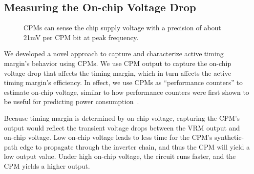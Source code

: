 \subsection{Measuring the On-chip Voltage Drop}
\label{sec:voltage:rootcause:cpm-measurement}

\begin{figure}[t]
\centering
\caption{CPMs can sense the chip supply voltage with a precision of about 21mV per CPM bit at peak frequency.}
\label{fig:cpm-analysis}
\end{figure}

We developed a novel approach to capture and characterize active timing margin's behavior using CPMs. We use CPM output to capture the on-chip voltage drop that affects the timing margin, which in turn affects the active timing margin's efficiency. In effect, we use CPMs as ``performance counters'' to estimate on-chip voltage, similar to how performance counters were first shown to be useful for predicting power consumption~\cite{isci2003runtime,huang2012accurate}.

Because timing margin is determined by on-chip voltage, capturing the CPM's output would reflect the transient voltage drops between the VRM output and on-chip voltage. Low on-chip voltage leads to less time for the CPM's synthetic-path edge to propagate through the inverter chain, and thus the CPM will yield a low output value. Under high on-chip voltage, the circuit runs faster, and the CPM yields a higher output.

